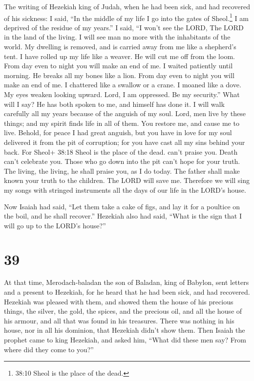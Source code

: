  The writing of Hezekiah king of Judah, when he had been
sick, and had recovered of his sickness:  I said, ``In the
middle of my life I go into the gates of Sheol.\footnote{38:10 Sheol is
  the place of the dead.} I am deprived of the residue of my years.''
 I said, ``I won't see the LORD, The LORD in the land of
the living. I will see man no more with the inhabitants of the world.
 My dwelling is removed, and is carried away from me like a
shepherd's tent. I have rolled up my life like a weaver. He will cut me
off from the loom. From day even to night you will make an end of me.
 I waited patiently until morning. He breaks all my bones
like a lion. From day even to night you will make an end of me.
 I chattered like a swallow or a crane. I moaned like a
dove. My eyes weaken looking upward. Lord, I am oppressed. Be my
security.''  What will I say? He has both spoken to me, and
himself has done it. I will walk carefully all my years because of the
anguish of my soul.  Lord, men live by these things; and my
spirit finds life in all of them. You restore me, and cause me to live.
 Behold, for peace I had great anguish, but you have in
love for my soul delivered it from the pit of corruption; for you have
cast all my sins behind your back.  For Sheol+ 38:18 Sheol
is the place of the dead. can't praise you. Death can't celebrate you.
Those who go down into the pit can't hope for your truth. 
The living, the living, he shall praise you, as I do today. The father
shall make known your truth to the children.  The LORD will
save me. Therefore we will sing my songs with stringed instruments all
the days of our life in the LORD's house.

 Now Isaiah had said, ``Let them take a cake of figs, and
lay it for a poultice on the boil, and he shall recover.'' 
Hezekiah also had said, ``What is the sign that I will go up to the
LORD's house?''

\hypertarget{section-38}{%
\section{39}\label{section-38}}

 At that time, Merodach-baladan the son of Baladan, king of
Babylon, sent letters and a present to Hezekiah, for he heard that he
had been sick, and had recovered.  Hezekiah was pleased with
them, and showed them the house of his precious things, the silver, the
gold, the spices, and the precious oil, and all the house of his armour,
and all that was found in his treasures. There was nothing in his house,
nor in all his dominion, that Hezekiah didn't show them. 
Then Isaiah the prophet came to king Hezekiah, and asked him, ``What did
these men say? From where did they come to you?''

